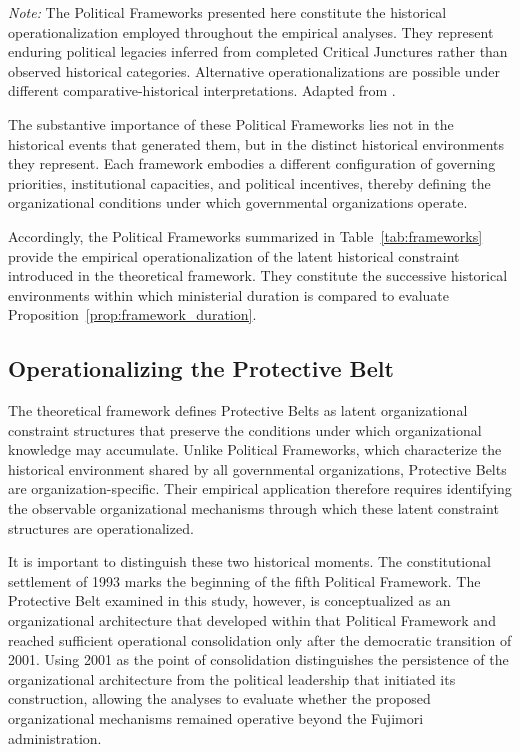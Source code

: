 \documentclass[doc, 12pt, a4paper,floatsintext]{apa7}
\begin{document}
\begin{table}[!htbp]
\begin{tabular}{p{3.0cm}p{1.8cm}p{4.2cm}p{5.2cm}}
\bottomrule
\end{tabular}

\vspace{0.2cm}

\begin{minipage}{0.96\textwidth}
\scriptsize
\textit{Note:} The Political Frameworks presented here constitute the historical operationalization employed throughout the empirical analyses. They represent enduring political legacies inferred from completed Critical Junctures rather than observed historical categories. Alternative operationalizations are possible under different comparative-historical interpretations. Adapted from \textcite{lopez_jimenez_peru_2025}.
\end{minipage}
\end{table}
%
%
The substantive importance of these Political Frameworks lies not in the historical events that generated them, but in the distinct historical environments they represent. Each framework embodies a different configuration of governing priorities, institutional capacities, and political incentives, thereby defining the organizational conditions under which governmental organizations operate.


Accordingly, the Political Frameworks summarized in Table~\ref{tab:frameworks} provide the empirical operationalization of the latent historical constraint introduced in the theoretical framework. They constitute the successive historical environments within which ministerial duration is compared to evaluate Proposition~\ref{prop:framework_duration}.
%
%
\subsection{Operationalizing the Protective Belt}
%
The theoretical framework defines Protective Belts as latent organizational constraint structures that preserve the conditions under which organizational knowledge may accumulate. Unlike Political Frameworks, which characterize the historical environment shared by all governmental organizations, Protective Belts are organization-specific. Their empirical application therefore requires identifying the observable organizational mechanisms through which these latent constraint structures are operationalized.

It is important to distinguish these two historical moments. The constitutional settlement of 1993 marks the beginning of the fifth Political Framework. The Protective Belt examined in this study, however, is conceptualized as an organizational architecture that developed within that Political Framework and reached sufficient operational consolidation only after the democratic transition of 2001. Using 2001 as the point of consolidation distinguishes the persistence of the organizational architecture from the political leadership that initiated its construction, allowing the analyses to evaluate whether the proposed organizational mechanisms remained operative beyond the Fujimori administration.
\end{document}
